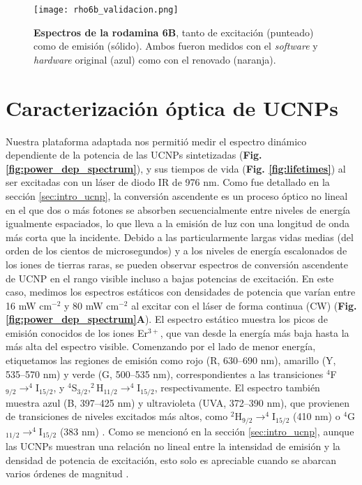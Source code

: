 \begin{SCfigure}
    \centering
    \texttt{[image: rho6b\_validacion.png]}
    \caption{\textbf{Espectros de la rodamina 6B}, tanto de excitación (punteado) como de emisión (sólido). Ambos fueron medidos con el \textit{software} y \textit{hardware} original (azul) como con el renovado (naranja).}
    \label{fig:rodamina}
\end{SCfigure}

\section{Caracterización óptica de UCNPs}

Nuestra plataforma adaptada nos permitió medir el espectro dinámico dependiente de la potencia de las UCNPs sintetizadas (\textbf{Fig. \ref{fig:power_dep_spectrum}}), y sus tiempos de vida (\textbf{Fig. \ref{fig:lifetimes}}) al ser excitadas con un láser de diodo IR de 976 nm.  
Como fue detallado en la sección \ref{sec:intro_ucnp}, la conversión ascendente es un proceso óptico no lineal en el que dos o más fotones se absorben secuencialmente entre niveles de energía igualmente espaciados, lo que lleva a la emisión de luz con una longitud de onda más corta que la incidente.  
Debido a las particularmente largas vidas medias (del orden de los cientos de microsegundos) y a los niveles de energía escalonados de los iones de tierras raras, se pueden observar espectros de conversión ascendente de UCNP en el rango visible incluso a bajas potencias de excitación.  
En este caso, medimos los espectros estáticos con densidades de potencia que varían entre 16 mW cm$^{-2}$ y 80 mW cm$^{-2}$ al excitar con el láser de forma continua (CW) (\textbf{Fig. \ref{fig:power_dep_spectrum}A}).  
El espectro estático muestra los picos de emisión conocidos de los iones Er$^{3+}$, que van desde la energía más baja hasta la más alta del espectro visible.  
Comenzando por el lado de menor energía, etiquetamos las regiones de emisión como rojo (R, 630–690 nm), amarillo (Y, 535–570 nm) y verde (G, 500–535 nm), correspondientes a las transiciones $^4$F$_{9/2} \to ^4$I$_{15/2}$, y $^4$S$_{3/2}, ^2$H$_{11/2} \to ^4$I$_{15/2}$, respectivamente.  
El espectro también muestra azul (B, 397–425 nm) y ultravioleta (UVA, 372–390 nm), que provienen de transiciones de niveles excitados más altos, como $^2$H$_{9/2} \to ^4$I$_{15/2}$ (410 nm) o $^4$G$_{11/2} \to ^4$I$_{15/2}$ (383 nm) \cite{haase_upconverting_2011}.  
Como se mencionó en la sección \ref{sec:intro_ucnp}, aunque las UCNPs muestran una relación no lineal entre la intensidad de emisión y la densidad de potencia de excitación, esto solo es apreciable cuando se abarcan varios órdenes de magnitud \cite{pollnau2000}.  
